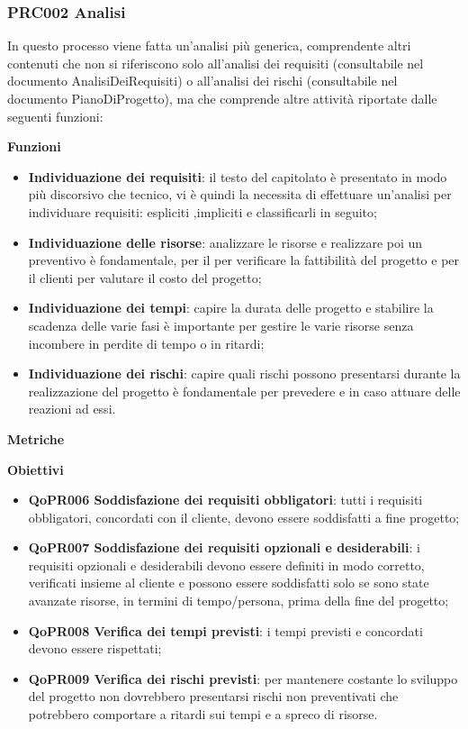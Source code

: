 \documentclass[../piano-di-qualifica.tex]{subfiles}
\begin{document}
\subsubsection{PRC002 Analisi}
\label{sub:analisi}
In questo processo viene fatta un'analisi più generica, comprendente altri contenuti che non si riferiscono solo all'analisi dei requisiti (consultabile nel documento AnalisiDeiRequisiti) o all'analisi dei rischi (consultabile nel documento PianoDiProgetto), ma che comprende altre attività riportate dalle seguenti funzioni:

\textbf{Funzioni}
\begin{itemize}
    \item \textbf{Individuazione dei requisiti}: il testo del capitolato è presentato in modo più discorsivo che tecnico, vi è quindi la necessita di effettuare un'analisi per individuare requisiti: espliciti ,impliciti e classificarli in seguito;
    \item \textbf{Individuazione delle risorse}: analizzare le risorse e realizzare poi un preventivo è fondamentale, per il  per verificare la fattibilità del progetto e per il clienti per valutare il costo del progetto;
    \item \textbf{Individuazione dei tempi}: capire la durata delle progetto e stabilire la scadenza delle varie fasi è importante per gestire le varie risorse senza incombere in perdite di tempo o in ritardi;
    \item \textbf{Individuazione dei rischi}: capire quali rischi possono presentarsi durante la realizzazione del progetto è fondamentale per prevedere e in caso attuare delle reazioni ad essi.
\end{itemize}

\textbf{Metriche}

\textbf{Obiettivi}
\begin{itemize}
    \item \textbf{QoPR006 Soddisfazione dei requisiti obbligatori}: tutti i requisiti obbligatori, concordati con il cliente, devono essere soddisfatti a fine progetto;
    \item \textbf{QoPR007 Soddisfazione dei requisiti opzionali e desiderabili}: i requisiti opzionali e desiderabili devono essere definiti in modo corretto, verificati insieme al cliente e possono essere soddisfatti solo se sono state avanzate risorse, in termini di tempo/persona, prima della fine del progetto;
    \item \textbf{QoPR008 Verifica dei tempi previsti}: i tempi previsti e concordati devono essere rispettati;
    \item \textbf{QoPR009 Verifica dei rischi previsti}: per mantenere costante lo sviluppo del progetto non dovrebbero presentarsi rischi non preventivati che potrebbero comportare a ritardi sui tempi e a spreco di risorse.
\end{itemize}
\end{document}
